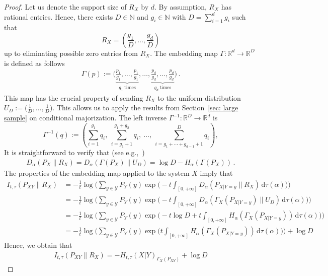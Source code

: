 \documentclass[aps,pra,11pt,onecolumn,nofootinbib,tightenlines]{revtex4-2}
\theoremstyle{definition}
\newcommand{\mc}[1]{\mathcal{#1}}
\begin{document}
\begin{proof}
Let us denote the support size of $R_X$ by $d$. By assumption, $R_X$ has rational entries. Hence, there exists $D \in \mathbb{N}$ and $g_i \in \mathbb{N}$ with $D= \sum_{i=1}^d g_i$ such that
\begin{equation}
R_X = \left( \frac{g_1}{D}, \ldots, \frac{g_d}{D} \right)
\end{equation}
up to eliminating possible zero entries from $R_X$. The embedding map $\Gamma : \mathbb{R}^d \to \mathbb{R}^D$ is defined as follows
\begin{align}
\Gamma(p) := \Big( \underbrace{\frac{p_1}{g_1}, \ldots, \frac{p_1}{g_1}}_{g_1 \ \text{times}}, \ldots, \underbrace{\frac{p_d}{g_d}, \ldots, \frac{p_d}{g_d}}_{g_d \ \text{times}} \Big)\,.
\end{align}
This map has the crucial property of sending $R_X$ to the uniform distribution $U_D := \big(\tfrac{1}{D}, \ldots, \tfrac{1}{D}\big)$. This allows us to apply the results from Section~\ref{sec: large sample} on conditional majorization.
The left inverse $\Gamma^{-1} : \mathbb{R}^D \to \mathbb{R}^d$ is
\begin{equation}
\label{PsInvEmbed}
\Gamma^{-1}(q) := \left( \sum_{i=1}^{g_1} q_i,\ \sum_{i=g_1+1}^{g_1 + g_2} q_i,\ \ldots,\ \sum_{i = g_1 + \cdots + g_{d-1} + 1}^{D} q_i \right),
\end{equation}
It is straightforward to verify that (see e.g.,~\cite[Lemma 13]{Brandao})
\begin{align}
    D_{\alpha}(P_X \| R_X) = D_{\alpha}(\Gamma(P_X) \| U_D) = \log{D} - H_\alpha (\Gamma(P_X))\,.
\end{align}
The properties of the embedding map applied to the system $X$ imply that
\begin{align}
    I_{t,\tau}(P_{XY} \| R_X) &=  -\frac{1}{t} \log \Bigg( \sum_{y \in \mc Y} P_Y(y) \exp \Big( -t\int_{[0,+\infty]}D_\alpha(P_{X|Y=y} \| R_{X}) \, \mathrm{d} \tau(\alpha) \Big) \Bigg) \\
    & =-\frac{1}{t} \log \Bigg( \sum_{y \in\mc Y} P_Y(y) \exp \Big( -t\int_{[0,+\infty]} D_\alpha(\Gamma_X(P_{X|Y=y}) \| U_D) \, \mathrm{d} \tau(\alpha) \Big) \Bigg) \\
    & = -\frac{1}{t} \log \Bigg( \sum_{y \in\mc Y} P_Y(y) \exp \Big( -t \log{D} +t\int_{[0,+\infty]} H_\alpha(\Gamma_X(P_{X|Y=y})) \, \mathrm{d} \tau(\alpha) \Big) \Bigg)\\
    & = -\frac{1}{t} \log \Bigg( \sum_{y \in\mc Y} P_Y(y) \exp \Big(t\int_{[0,+\infty]} H_\alpha(\Gamma_X(P_{X|Y=y})) \, \mathrm{d} \tau(\alpha) \Big) \Bigg) + \log{D}
\end{align}
Hence, we obtain that
\begin{align}
    I_{t,\tau}(P_{XY} \| R_X) = -H_{t,\tau}(X|Y)_{\Gamma_X(P_{XY})} + \log{D}
\end{align}


\end{proof}
\end{document}
